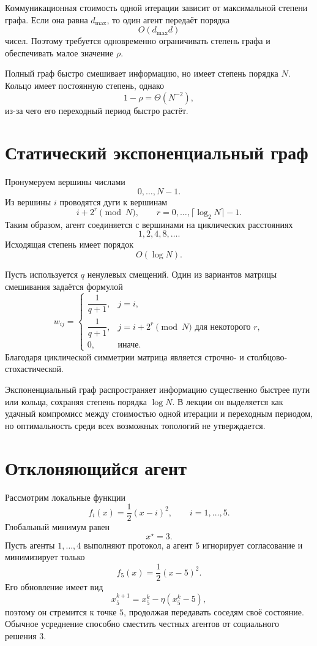Коммуникационная стоимость одной итерации зависит от максимальной
степени графа. Если она равна \(d_{\max}\), то один агент передаёт
порядка
\[
    O(d_{\max}d)
\]
чисел. Поэтому требуется одновременно ограничивать степень графа и
обеспечивать малое значение \(\rho\).

Полный граф быстро смешивает информацию, но имеет степень порядка
\(N\). Кольцо имеет постоянную степень, однако
\[
    1-\rho=\Theta(N^{-2}),
\]
из-за чего его переходный период быстро растёт.

\section{Статический экспоненциальный граф}

Пронумеруем вершины числами
\[
    0,\ldots,N-1.
\]
Из вершины \(i\) проводятся дуги к вершинам
\[
    i+2^r\pmod N,
    \qquad
    r=0,\ldots,\lceil\log_2N\rceil-1.
\]
Таким образом, агент соединяется с вершинами на циклических
расстояниях
\[
    1,2,4,8,\ldots.
\]
Исходящая степень имеет порядок
\[
    O(\log N).
\]

Пусть используется \(q\) ненулевых смещений. Один из вариантов
матрицы смешивания задаётся формулой
\[
    w_{ij}
    =
    \begin{cases}
        \dfrac1{q+1},
        &
        j=i,
        \\[2mm]
        \dfrac1{q+1},
        &
        j=i+2^r\pmod N
        \text{ для некоторого }r,
        \\[2mm]
        0,
        &
        \text{иначе}.
    \end{cases}
\]
Благодаря циклической симметрии матрица является строчно- и
столбцово-стохастической.

Экспоненциальный граф распространяет информацию существенно быстрее
пути или кольца, сохраняя степень порядка \(\log N\). В лекции он
выделяется как удачный компромисс между стоимостью одной итерации и
переходным периодом, но оптимальность среди всех возможных топологий
не утверждается.

\section{Отклоняющийся агент}

Рассмотрим локальные функции
\[
    f_i(x)=\frac12(x-i)^2,
    \qquad
    i=1,\ldots,5.
\]
Глобальный минимум равен
\[
    x^\star=3.
\]
Пусть агенты \(1,\ldots,4\) выполняют протокол, а агент \(5\)
игнорирует согласование и минимизирует только
\[
    f_5(x)=\frac12(x-5)^2.
\]
Его обновление имеет вид
\[
    x_5^{k+1}
    =
    x_5^k-\eta(x_5^k-5),
\]
поэтому он стремится к точке \(5\), продолжая передавать соседям своё
состояние. Обычное усреднение способно сместить честных агентов от
социального решения \(3\).

